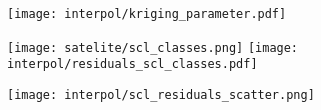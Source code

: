 \begin{frame}
    \texttt{[image: interpol/kriging\_parameter.pdf]}
\end{frame}

\begin{frame}
    \texttt{[image: satelite/scl\_classes.png]}
    \texttt{[image: interpol/residuals\_scl\_classes.pdf]}

\end{frame}

\begin{frame}
    \begin{center}
        \texttt{[image: interpol/scl\_residuals\_scatter.png]}
    \end{center}
\end{frame}